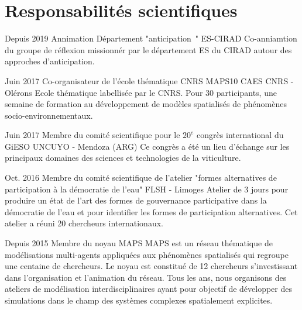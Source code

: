 \documentclass[]{cv-etienne}
\begin{document}
\section{Responsabilités scientifiques}
\begin{entrylist}
\entry
{Depuis 2019}
{Annimation Département "anticipation "}
{ES-CIRAD}
{Co-anniamtion du groupe de réflexion missionnér par le département ES du CIRAD autour des approches d'anticipation.}
\end{entrylist}
\begin{entrylist}
\entry
{Juin 2017}
{Co-organisateur de l'école thématique CNRS MAPS10}
{CAES CNRS - Olérons}
{Ecole thématique labellisée par le CNRS. Pour 30 participants, une semaine de formation au développement de modèles spatialisés de phénomènes socio-environnementaux.}
\end{entrylist}
\begin{entrylist}
\entry
{Juin 2017}
{Membre du comité scientifique pour le $20^{e}$ congrès international du GiESO}
{UNCUYO - Mendoza (ARG)}
{Ce congrès a été un lieu d'échange sur les principaux domaines des sciences et technologies de la viticulture.}
\end{entrylist}
\begin{entrylist}
\entry
{Oct. 2016}
{Membre du comité scientifique de l'atelier "formes alternatives de participation à la démocratie de l'eau"}
{FLSH - Limoges}
{Atelier de 3 jours pour produire un état de l'art des formes de gouvernance participative dans la démocratie de l'eau et pour identifier les formes de participation alternatives. Cet atelier a réuni 20 chercheurs internationaux.}
\end{entrylist}
\begin{entrylist}
\entry
{Depuis 2015}
{Membre du noyau MAPS}
{}
{MAPS est un réseau thématique de modélisations multi-agents appliquées aux phénomènes spatialisés qui regroupe une centaine de chercheurs. Le noyau est constitué de 12 chercheurs s'investissant dans l'organisation et l'animation du réseau. Tous les ans, nous organisons des ateliers de modélisation interdisciplinaires ayant pour objectif de développer des simulations dans le champ des systèmes complexes spatialement explicites.}
\end{entrylist}
\end{document}
